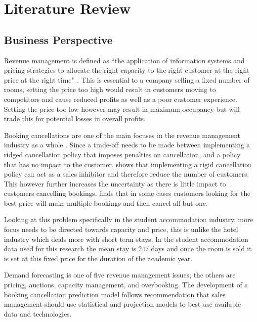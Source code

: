\chapter{Literature Review}
\label{ch:lit_rev}

\section{Business Perspective}

Revenue management is defined as “the application of information systems and pricing strategies to allocate the right capacity to the right customer at the right price at the right time” \cite{Kimes2003HasAcceptable}. This is essential to a company selling a fixed number of rooms, setting the price too high would result in customers moving to competitors and cause reduced profits as well as a poor customer experience. Setting the price too low however may result in maximum occupancy but will trade this for potential losses in overall profits.

\vspace{5mm}

Booking cancellations are one of the main focuses in the revenue management industry as a whole \cite{Subramanian1999AirlineNo-shows}. Since a trade-off needs to be made between implementing a ridged cancellation policy that imposes penalties on cancellation, and a policy that has no impact to the customer. \cite{Jinhong2007ServiceCancellations} shows that implementing a rigid cancellation policy can act as a sales inhibitor and therefore reduce the number of customers. This however further increases the uncertainty as there is little impact to customers cancelling bookings. \cite{Talluri2004TheManagement} finds that in some cases customers looking for the best price will make multiple bookings and then cancel all but one. 

\vspace{5mm}

Looking at this problem specifically in the student accommodation industry, more focus needs to be directed towards capacity and price, this is unlike the hotel industry which deals more with short term stays. In the student accommodation data used for this research the mean stay is 247 days and once the room is sold it is set at this fixed price for the duration of the academic year.

 \vspace{5mm}
 
Demand forecasting is one of five revenue management issues; the others are pricing, auctions, capacity management, and overbooking. The development of a booking cancellation prediction model follows \cite{Chiang2007AnResearch} recommendation that sales management should use statistical and projection models to best use available data and technologies.
 
